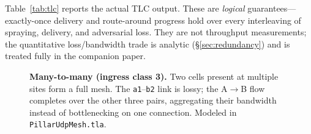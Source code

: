 \documentclass[10pt,twocolumn]{article}
\newcommand{\code}[1]{\texttt{\small #1}}
\begin{document}
Table~\ref{tab:tlc} reports the actual TLC output. These are \emph{logical}
guarantees---exactly-once delivery and route-around progress hold over every
interleaving of spraying, delivery, and adversarial loss. They are not
throughput measurements; the quantitative loss/bandwidth trade is analytic
(\S\ref{sec:redundancy}) and is treated fully in the companion paper.

\begin{figure}[t]
\centering
{}
\caption{\textbf{Many-to-many (ingress class 3).} Two cells present at multiple
sites form a full mesh. The \code{a1}--\code{b2} link is lossy; the A$\to$B flow
completes over the other three pairs, aggregating their bandwidth instead of
bottlenecking on one connection. Modeled in \code{PillarUdpMesh.tla}.}
\label{fig:manytomany}
\end{figure}
\end{document}
